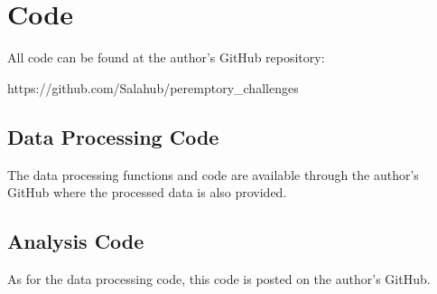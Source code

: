 \chapter{Code}
\label{app:code}

All code can be found at the author's GitHub repository:

https://github.com/Salahub/peremptory\_challenges

\section{Data Processing Code}\label{app:proccode}
The data processing functions and code are available through the
author's GitHub where the processed data is also provided.

%

\section{Analysis Code} \label{app:analysis}
As for the data processing code, this code is posted on the author's GitHub.

%
